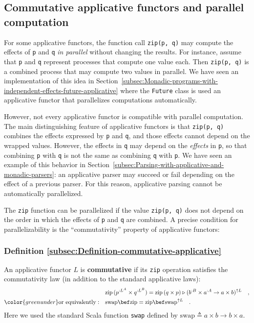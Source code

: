 \subsection{Commutative applicative functors and parallel computation\label{subsec:Commutative-applicative-functors}}

For some applicative functors, the function call \lstinline!zip(p, q)!
may compute the effects of \lstinline!p! and \lstinline!q! \emph{in
parallel} without changing the results. For instance, assume that
\lstinline!p! and \lstinline!q! represent processes that compute
one value each. Then \lstinline!zip(p, q)! is a combined process
that may compute two values in parallel. We have seen an implementation
of this idea in Section~\ref{subsec:Monadic-programs-with-independent-effects-future-applicative}
where the \lstinline!Future! class is used an applicative functor
that parallelizes computations automatically.

However, not every applicative functor is compatible with parallel
computation. The main distinguishing feature of applicative functors
is that \lstinline!zip(p, q)! combines the effects expressed by \lstinline!p!
and \lstinline!q!, and those effects cannot depend on the wrapped
values. However, the effects in \lstinline!q! may depend on the \emph{effects}
in \lstinline!p!, so that combining \lstinline!p! with \lstinline!q!
is not the same as combining \lstinline!q! with \lstinline!p!. We
have seen an example of this behavior in Section~\ref{subsec:Parsing-with-applicative-and-monadic-parsers}:
an applicative parser may succeed or fail depending on the effect
of a previous parser. For this reason, applicative parsing cannot
be automatically parallelized.

The \lstinline!zip! function can be parallelized if the value \lstinline!zip(p, q)!
does not depend on the order in which the effects of \lstinline!p!
and \lstinline!q! are combined. A precise condition for parallelizability
is the \textsf{``}commutativity\textsf{''} property of applicative functors:

\subsubsection{Definition \label{subsec:Definition-commutative-applicative}\ref{subsec:Definition-commutative-applicative}}

An applicative functor $L$ is \textbf{commutative}
if its \lstinline!zip! operation satisfies the commutativity law
(in addition to the standard applicative laws):
\begin{align}
 & \text{zip}\,(p^{:L^{A}}\times q^{:L^{B}})=\text{zip}\,(q\times p)\triangleright(b^{:B}\times a^{:A}\rightarrow a\times b)^{\uparrow L}\quad,\nonumber \\
{\color{greenunder}\text{or equivalently}:}\quad & \text{swap}\bef\text{zip}=\text{zip}\bef\text{swap}^{\uparrow L}\quad.\label{eq:commutativity-law-of-zip}
\end{align}
Here we used the standard Scala function \lstinline!swap! defined
by $\text{swap}\triangleq a\times b\rightarrow b\times a$. 

